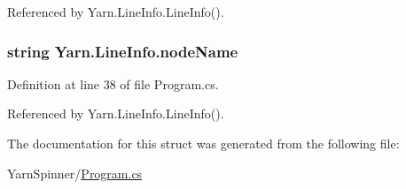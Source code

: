 Referenced by Yarn.\-Line\-Info.\-Line\-Info().

\hypertarget{a00125_a5a91331fb123e29d71d69e096f943c2f}{
\subsubsection[{node\-Name}]{\setlength{\rightskip}{0pt plus 5cm}string Yarn.\-Line\-Info.\-node\-Name}}\label{a00125_a5a91331fb123e29d71d69e096f943c2f}


Definition at line 38 of file Program.\-cs.



Referenced by Yarn.\-Line\-Info.\-Line\-Info().



The documentation for this struct was generated from the following file\-:\begin{DoxyCompactItemize}
\item 
Yarn\-Spinner/\hyperlink{a00292}{Program.\-cs}\end{DoxyCompactItemize}
